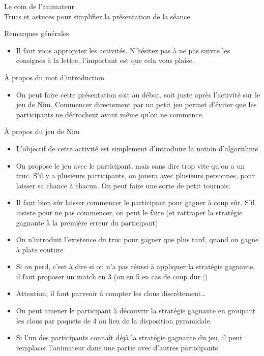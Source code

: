 \documentclass[final,hyperref={pdfpagelabels=false}]{beamer}
\renewcommand*{\large}{\fontsize{\resultlargeX}{\resultlargeY}\selectfont}
\begin{document}
\begin{frame}{Le coin de l'animateur\\[-5pt]
  {\large Trucs et astuces pour simplifier la présentation de la séance}}
  \begin{block}{Remarques générales}
    \begin{itemize}
    \item Il faut vous approprier les activités. N'hésitez pas à ne pas suivre
      les consignes à la lettre, l'important est que cela vous plaise.
    \end{itemize}
  \end{block}
  \begin{block}{À propos du mot d'introduction}
    \begin{itemize}
    \item On peut faire cette présentation soit au début, soit juste après
      l'activité sur le jeu de Nim. Commencer directement par un petit jeu
      permet d'éviter que les participants ne décrochent avant même qu'on ne commence.
    \end{itemize}
  \end{block}
  \begin{block}{À propos du jeu de Nim}
    \begin{itemize}
    \item L'objectif de cette activité est simplement d'introduire la notion d'algorithme
    \item On propose le jeu avec le participant, mais sans dire trop vite qu'on
      a un truc. S'il y a plusieurs participants, on jouera avec plusieurs
      personnes, pour laisser sa chance à chacun. On peut faire une sorte de
      petit tournois.
    \item Il faut bien sûr laisser commencer le participant pour gagner à coup
      sûr. S'il insiste pour ne pas commencer, on peut le faire (et rattraper
      la stratégie gagnante à la première erreur du participant)
    \item On n'introduit l'existence du truc pour gagner que plus tard, quand
      on gagne à plate couture
    \item Si on perd, c'est à dire si on n'a pas réussi à appliquer la
      stratégie gagnante, il faut proposer un match en 3 (ou en 5 en cas de
      coup dur ;)
    \item Attention, il faut parvenir à compter les clous discrètement\ldots
    \item On peut amener le participant à découvrir la stratégie gagnante en
      groupant les clous par paquets de 4 au lieu de la disposition pyramidale.
    \item Si l'un des participants connaît déjà la stratégie gagnante du jeu,
      il peut remplacer l'animateur dans une partie avec d'autres participants
    \end{itemize}    
  \end{block}
\end{frame}
\end{document}
